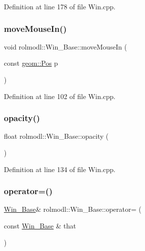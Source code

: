 Definition at line 178 of file Win.\+cpp.

\mbox{\label{classrolmodl_1_1_win___base_a78a1ebd530b3a7a54eb355e77df2377f}} 
\subsubsection{\texorpdfstring{moveMouseIn()}{moveMouseIn()}}
{\footnotesize\ttfamily void rolmodl\+::\+Win\+\_\+\+Base\+::move\+Mouse\+In (\begin{DoxyParamCaption}\item[{const \mbox{\hyperlink{structrolmodl_1_1geom_1_1_pos}{geom\+::\+Pos}}}]{p }\end{DoxyParamCaption})\hspace{0.3cm}{\ttfamily [noexcept]}}



Definition at line 102 of file Win.\+cpp.

\mbox{\label{classrolmodl_1_1_win___base_a8e3fc6d2a7ea0a102be3b097c0b171af}} 
\subsubsection{\texorpdfstring{opacity()}{opacity()}}
{\footnotesize\ttfamily float rolmodl\+::\+Win\+\_\+\+Base\+::opacity (\begin{DoxyParamCaption}{ }\end{DoxyParamCaption})}



Definition at line 134 of file Win.\+cpp.

\mbox{\label{classrolmodl_1_1_win___base_a0e6f5c3f13dd7f8a30c9e689a8dddb58}} 
\subsubsection{\texorpdfstring{operator=()}{operator=()}\hspace{0.1cm}{\footnotesize\ttfamily [1/2]}}
{\footnotesize\ttfamily \mbox{\hyperlink{classrolmodl_1_1_win___base}{Win\+\_\+\+Base}}\& rolmodl\+::\+Win\+\_\+\+Base\+::operator= (\begin{DoxyParamCaption}\item[{const \mbox{\hyperlink{classrolmodl_1_1_win___base}{Win\+\_\+\+Base}} \&}]{that }\end{DoxyParamCaption})\hspace{0.3cm}{\ttfamily [delete]}}

